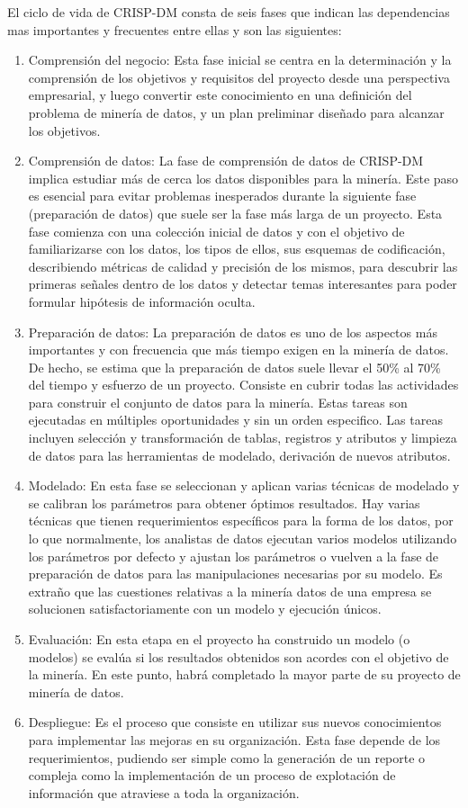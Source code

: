 El ciclo de vida de CRISP-DM consta de seis fases que indican las dependencias mas importantes y frecuentes entre ellas\cite{ibmcrispdm} y son las siguientes:

\begin{enumerate}
\item Comprensión del negocio: Esta fase inicial se centra en la determinación y la comprensión de los objetivos y requisitos del proyecto desde una perspectiva empresarial, y luego convertir este conocimiento en una definición del problema de minería de datos, y un plan preliminar diseñado para alcanzar los objetivos.
\item Comprensión de datos: La fase de comprensión de datos de CRISP-DM implica estudiar más de cerca los datos disponibles para la minería. Este paso es esencial para evitar problemas inesperados durante la siguiente fase (preparación de datos) que suele ser la fase más larga de un proyecto. Esta fase comienza con una colección inicial de datos y con el objetivo de familiarizarse con los datos, los tipos de ellos, sus esquemas de codificación, describiendo métricas de calidad y precisión de los mismos, para descubrir las primeras señales dentro de los datos y detectar temas interesantes para poder formular hipótesis de información oculta.
\item Preparación de datos: La preparación de datos es uno de los aspectos más importantes y con frecuencia que más tiempo exigen en la minería de datos. De hecho, se estima que la preparación de datos suele llevar el 50\% al 70\% del tiempo y esfuerzo de un proyecto. Consiste en cubrir todas las actividades para construir el conjunto de datos para la minería.\cite{ibmcrispdm} Estas tareas son ejecutadas en múltiples oportunidades y sin un orden especifico. Las tareas incluyen selección y transformación de tablas, registros y atributos y limpieza de datos para las herramientas de modelado, derivación de nuevos atributos.
\item Modelado: En esta fase se seleccionan y aplican varias técnicas de modelado y se calibran los parámetros para obtener óptimos resultados. Hay varias técnicas que tienen requerimientos específicos para la forma de los datos, por lo que normalmente, los analistas de datos ejecutan varios modelos utilizando los parámetros por defecto y ajustan los parámetros o vuelven a la fase de preparación de datos para las manipulaciones necesarias por su modelo. Es extraño que las cuestiones relativas a la minería datos de una empresa se solucionen satisfactoriamente con un modelo y ejecución únicos.\cite{ibmcrispdm}
\item Evaluación: En esta etapa en el proyecto ha construido un modelo (o modelos) se evalúa  si los resultados obtenidos son acordes con el objetivo de la minería. En este punto, habrá completado la mayor parte de su proyecto de minería de datos.
\item Despliegue: Es el proceso que consiste en utilizar sus nuevos conocimientos para implementar las mejoras en su organización. Esta fase depende de los requerimientos, pudiendo ser simple como la generación de un reporte o compleja como la implementación de un proceso de explotación de información que atraviese a toda la organización.
\end{enumerate}

